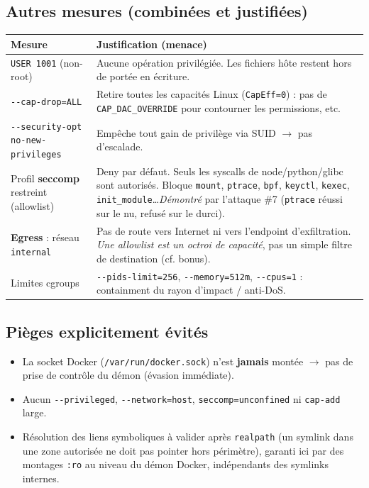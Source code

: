 \documentclass[11pt,a4paper]{article}
\begin{document}
\subsection{Autres mesures (combinées et justifiées)}
\begin{longtable}{@{}p{5.2cm}p{9.5cm}@{}}
\toprule
\textbf{Mesure} & \textbf{Justification (menace)} \\ \midrule
\texttt{USER 1001} (non-root) & Aucune opération privilégiée. Les fichiers hôte restent hors de portée en écriture. \\
\texttt{-{}-cap-drop=ALL} & Retire toutes les capacités Linux (\texttt{CapEff=0}) : pas de \texttt{CAP\_DAC\_OVERRIDE} pour contourner les permissions, etc. \\
\texttt{-{}-security-opt no-new-privileges} & Empêche tout gain de privilège via SUID $\rightarrow$ pas d'escalade. \\
Profil \textbf{seccomp} restreint (allowlist) & Deny par défaut. Seuls les syscalls de node/python/glibc sont autorisés. Bloque \texttt{mount}, \texttt{ptrace}, \texttt{bpf}, \texttt{keyctl}, \texttt{kexec}, \texttt{init\_module}\ldots \emph{Démontré} par l'attaque \#7 (\texttt{ptrace} réussi sur le nu, refusé sur le durci). \\
\textbf{Egress} : réseau \texttt{internal} & Pas de route vers Internet ni vers l'endpoint d'exfiltration. \emph{Une allowlist est un octroi de capacité}, pas un simple filtre de destination (cf. bonus). \\
Limites cgroups & \texttt{-{}-pids-limit=256}, \texttt{-{}-memory=512m}, \texttt{-{}-cpus=1} : containment du rayon d'impact / anti-DoS. \\ \bottomrule
\end{longtable}

\subsection{Pièges explicitement évités}
\begin{itemize}[leftmargin=1.2em,itemsep=1pt]
\item La socket Docker (\texttt{/var/run/docker.sock}) n'est \textbf{jamais} montée $\rightarrow$ pas de prise de contrôle du démon (évasion immédiate).
\item Aucun \texttt{-{}-privileged}, \texttt{-{}-network=host}, \texttt{seccomp=unconfined} ni \texttt{cap-add} large.
\item Résolution des liens symboliques à valider après \texttt{realpath} (un symlink dans une zone autorisée ne doit pas pointer hors périmètre), garanti ici par des montages \texttt{:ro} au niveau du démon Docker, indépendants des symlinks internes.
\end{itemize}
\end{document}
